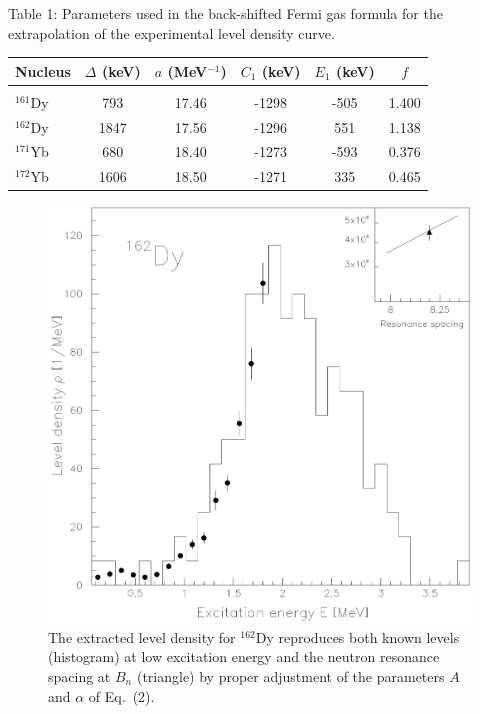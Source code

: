 

\begin{table}
Table 1: Parameters used in the back-shifted Fermi gas formula for the extrapolation of the experimental level density curve.\\
\begin{tabular}{l|c|c|c|c|c}
Nucleus    & $\Delta$ (keV) & $a$ (MeV$^{-1}$)& $C_1$ (keV) & $E_1$ (keV)& $f$ \\ \hline
&&&&&\\
$^{161}$Dy &       793      & 17.46           & -1298       &    -505    &  1.400     \\
$^{162}$Dy &      1847      & 17.56           & -1296       &     551    &  1.138     \\
$^{171}$Yb &       680      & 18.40           & -1273       &    -593    &  0.376     \\
$^{172}$Yb &      1606      & 18.50           & -1271       &     335    &  0.465     \\
\end{tabular}
\end{table}


\begin{figure}
\includegraphics[totalheight=17.5cm,angle=0,bb=0 20 350 730]{fig1.ps}
\caption{The extracted level density for $^{162}$Dy reproduces both known levels (histogram) at low excitation energy and the neutron resonance spacing at $B_n$ (triangle) by proper adjustment of the parameters $A$ and $\alpha$ of Eq.~(2).} 
\label{fig:fig1}
\end{figure}

